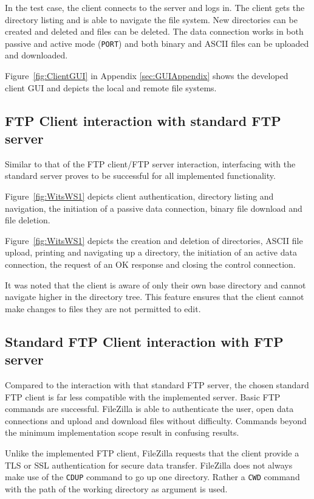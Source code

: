 \documentclass[10pt,twocolumn]{witseiepaper}
\begin{document}
In the test case, the client connects to the server and logs in. The client gets the directory listing and is able to navigate the file system. New directories can be created and deleted and files can be deleted. The data connection works in both passive and active mode (\texttt{PORT}) and both binary and ASCII files can be uploaded and downloaded.
 
Figure~\ref{fig:ClientGUI} in Appendix \ref{sec:GUIAppendix} shows the developed client GUI and depicts the local and remote file systems. 

\subsection{FTP Client interaction with standard FTP server}

Similar to that of the FTP client/FTP server interaction, interfacing with the standard server proves to be successful for all implemented functionality. 

Figure~\ref{fig:WitsWS1} depicts client authentication, directory listing and navigation, the initiation of a passive data connection, binary file download and file deletion. 

Figure~\ref{fig:WitsWS1} depicts the creation and deletion of directories, ASCII file upload, printing and navigating up a directory, the initiation of an active data connection, the request of an OK response and closing the control connection.

It was noted that the client is aware of only their own base directory and cannot navigate higher in the directory tree. This feature ensures that the client cannot make changes to files they are not permitted to edit.

\subsection{Standard FTP Client interaction with FTP server}

Compared to the interaction with that standard FTP server, the chosen standard FTP client is far less compatible with the implemented server. Basic FTP commands are successful. FileZilla is able to authenticate the user, open data connections and upload and download files without difficulty. Commands beyond the minimum implementation scope result in confusing results.

Unlike the implemented FTP client, FileZilla requests that the client provide a TLS or SSL authentication for secure data transfer. FileZilla does not always make use of the \texttt{CDUP} command to go up one directory. Rather a \texttt{CWD} command with the path of the working directory as argument is used. 
\end{document}
